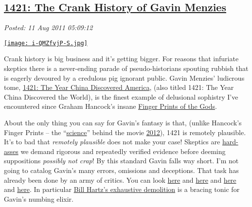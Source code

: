 %

\subsection*{\href{https://bakerjd99.wordpress.com/2011/08/11/1421-the-crank-history-of-gavin-menzies/}{1421: The Crank History of Gavin Menzies}}


\noindent\emph{Posted: 11 Aug 2011 05:09:12}
\vspace{6pt}

\captionsetup[floatingfigure]{labelformat=empty}
\begin{floatingfigure}[r]{0.25\textwidth}
\centering
\href{http://www.goodreads.com/book/show/4813.1421}{\texttt{[image: i-QMZfvjP-S.jpg]}}
\label{fig:1742X0}
\end{floatingfigure}Crank
history is big business and it's getting bigger. For reasons that
infuriate skeptics there is a never-ending parade of pseudo-historians
spouting rubbish that is eagerly devoured by a credulous pig ignorant
public. Gavin Menzies' ludicrous tome,
\href{http://www.1421exposed.com/html/1421\_and\_all\_that\_junk.html}{1421:
The Year China Discovered America}, (also titled 1421: The Year China
Discovered the World), is the finest example of delusional sophistry
I've encountered since Graham Hancock's insane
\href{http://www.csicop.org/si/show/tracing\_graham\_hancockrsquos\_shifting\_cataclysm/}{Finger
Prints of the Gods}.

About the only thing you can say for Gavin's fantasy is that, (unlike
Hancock's Finger Prints -- the
``\href{http://en.wikipedia.org/wiki/Fingerprints\_of\_the\_Gods}{science}''
behind the movie
\href{http://blog.moviefone.com/2011/01/03/nasa-names-most-realistic-and-unrealistic-sci-fi-films-of-all-ti/}{2012}),
1421 is remotely plausible. It's to bad that \emph{remotely plausible}
does not make your case! Skeptics are
\href{http://bakerjd99.wordpress.com/2009/10/29/hard-ass-skeptic-rules/}{hard-asses}
we demand rigorous and repeatedly verified evidence before deeming
suppositions \emph{possibly not crap}! By this standard Gavin falls way
short. I'm not going to catalog Gavin's many errors, omissions and
deceptions. That task has already been done by an army of critics. You
can look
\href{http://www.csicop.org/sb/show/zheng\_he\_in\_the\_americas\_and\_other\_unlikely\_tales\_of\_exploration\_and\_discov/}{here}
and
\href{https://docs.google.com/viewer?url=http://www.e-perimetron.org/Vol\_2\_4/Wade.pdf\&pli=1}{here}
and \href{http://www.asianreviewofbooks.com/new/?revID=201}{here} and
\href{http://badarchaeology.wordpress.com/tag/gavin-menzies/}{here}. In
particular \href{http://www.dightonrock.com/gavinsfantalyland.htm}{Bill
Hartz's exhaustive demolition} is a bracing tonic for Gavin's numbing
elixir.

